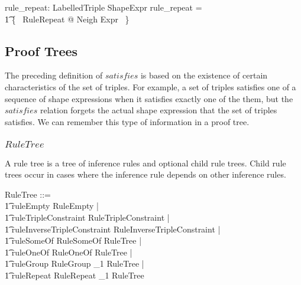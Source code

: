 \documentclass{article}
\begin{document}
\begin{axdef}
	rule\_repeat: \finset LabelledTriple \rel ShapeExpr
\where
	rule\_repeat = \\
\t1		\{~ RuleRepeat @ Neigh \mapsto Expr ~\}
\end{axdef}

\subsection{Proof Trees}
The preceding definition of $satisfies$ is based on the existence of certain characteristics of the set of triples.
For example, a set of triples satisfies one of a sequence of shape expressions when it satisfies exactly one of the them, 
but the $satisfies$ relation forgets the actual shape expression that the set of triples satisfies.
We can remember this type of information in a proof tree.

\subsubsection{$RuleTree$}
A rule tree is a tree of inference rules and optional child rule trees.
Child rule trees occur in cases where the inference rule depends on other inference rules.
\begin{zed}
	RuleTree ::= \\
\t1		ruleEmpty \ldata RuleEmpty \rdata | \\
\t1		ruleTripleConstraint \ldata RuleTripleConstraint \rdata | \\
\t1		ruleInverseTripleConstraint \ldata RuleInverseTripleConstraint \rdata | \\
\t1		ruleSomeOf \ldata RuleSomeOf \cross RuleTree \rdata | \\
\t1		ruleOneOf \ldata RuleOneOf \cross RuleTree \rdata | \\
\t1		ruleGroup \ldata RuleGroup \cross \seq_1 RuleTree \rdata | \\
\t1		ruleRepeat \ldata RuleRepeat \cross \seq_1 RuleTree \rdata
\end{zed}
\end{document}
